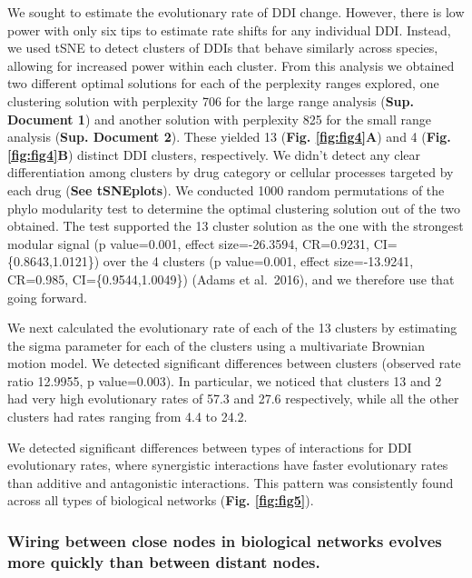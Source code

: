 \documentclass[
]{article}
\begin{document}
We sought to estimate the evolutionary rate of DDI change. However, there is low power with only six tips to estimate rate shifts for any individual DDI. Instead, we used tSNE to detect clusters of DDIs that behave similarly across species, allowing for increased power within each cluster. From this analysis we obtained two different optimal solutions for each of the perplexity ranges explored, one clustering solution with perplexity 706 for the large range analysis (\textbf{Sup. Document 1}) and another solution with perplexity 825 for the small range analysis (\textbf{Sup. Document 2}). These yielded 13 (\textbf{Fig. \ref{fig:fig4}A}) and 4 (\textbf{Fig. \ref{fig:fig4}B}) distinct DDI clusters, respectively. We didn't detect any clear differentiation among clusters by drug category or cellular processes targeted by each drug (\textbf{See tSNEplots}). We conducted 1000 random permutations of the phylo modularity test to determine the optimal clustering solution out of the two obtained. The test supported the 13 cluster solution as the one with the strongest modular signal (p value=0.001, effect size=-26.3594, CR=0.9231, CI= \{0.8643,1.0121\}) over the 4 clusters (p value=0.001, effect size=-13.9241, CR=0.985, CI=\{0.9544,1.0049\}) (Adams et al.~2016), and we therefore use that going forward.

We next calculated the evolutionary rate of each of the 13 clusters by estimating the sigma parameter for each of the clusters using a multivariate Brownian motion model. We detected significant differences between clusters (observed rate ratio 12.9955, p value=0.003). In particular, we noticed that clusters 13 and 2 had very high evolutionary rates of 57.3 and 27.6 respectively, while all the other clusters had rates ranging from 4.4 to 24.2.

We detected significant differences between types of interactions for DDI evolutionary rates, where synergistic interactions have faster evolutionary rates than additive and antagonistic interactions. This pattern was consistently found across all types of biological networks (\textbf{Fig. \ref{fig:fig5}}).

\hypertarget{wiring-between-close-nodes-in-biological-networks-evolves-more-quickly-than-between-distant-nodes.}{%
\subsubsection{Wiring between close nodes in biological networks evolves more quickly than between distant nodes.}\label{wiring-between-close-nodes-in-biological-networks-evolves-more-quickly-than-between-distant-nodes.}}
\end{document}
